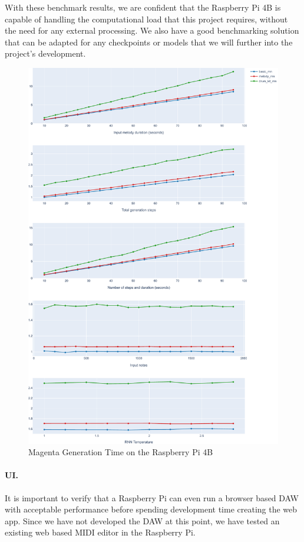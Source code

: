 With these benchmark results, we are confident that the Raspberry Pi 4B is capable of
handling the computational load that this project requires, without the need for any
external processing. We also have a good benchmarking solution that can be adapted for any
checkpoints or models that we will further into the project's development.

\begin{figure}
  \centerline{ \includegraphics[width=.95\linewidth]{image/perf.pdf} }
  \caption{Magenta Generation Time on the Raspberry Pi 4B}
  \label{fig:magentaperf}
\end{figure}

\paragraph{UI.} It is important to verify that a Raspberry Pi can even run a browser based
DAW with acceptable performance before spending development time creating the web app.
Since we have not developed the DAW at this point, we have tested an existing web based
MIDI editor in the Raspberry Pi.

